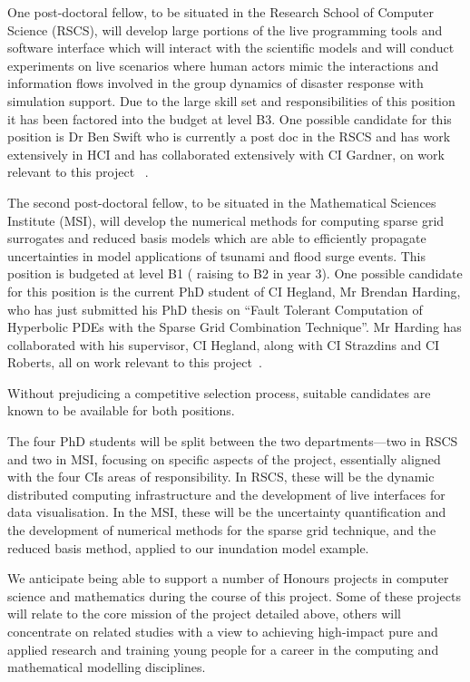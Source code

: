 One post-doctoral fellow, to be situated in the
Research School of Computer Science (RSCS), will develop large
portions of the live programming tools and software interface which
will interact with the scientific models and will conduct experiments
on live scenarios where human actors mimic the interactions and
information flows involved in the group dynamics of disaster response
with simulation support. Due to the large skill set and responsibilities of 
this position it has been factored into the budget at level B3.
One possible candidate for this position is 
Dr Ben Swift who is currently a post doc in the RSCS and has work 
extensively in HCI and has collaborated extensively with CI Gardner, on work 
relevant to this project ~\parencite{martin2016intelligent,martin2015tracking,swift2014coding,swift2013visual,swift_live_2016}.


The second post-doctoral fellow, to be
situated in the Mathematical Sciences Institute (MSI), will develop
the numerical methods for computing sparse grid surrogates and reduced
basis models which are able to efficiently propagate uncertainties in
model applications of tsunami and flood surge events. This 
position is budgeted at level B1 ( raising to B2 in year 3).
One possible candidate for this position is the current PhD 
student of CI Hegland, Mr Brendan Harding,  who has just 
submitted his PhD thesis on ``Fault Tolerant Computation of
Hyperbolic PDEs with the Sparse Grid Combination Technique''.
Mr Harding has collaborated with his supervisor, 
CI Hegland, along with CI Strazdins and CI Roberts, all
on work relevant to this project~\parencite{deBaarHarding2015,
AliEtal2015,StrazdinsEtal2015,HardingHLS2015,Ali11022016}.


Without prejudicing a competitive selection process, suitable candidates 
are known to be available for both positions.

The four PhD students will be split between the two departments---two
in RSCS and two in MSI, focusing on specific aspects of the project,
essentially aligned with the four CIs areas of responsibility.  In
RSCS, these will be the dynamic distributed computing infrastructure
and the development of live interfaces for data visualisation. In the
MSI, these will be the uncertainty quantification and the development
of numerical methods for the sparse grid technique, and the reduced
basis method, applied to our inundation model example.

We anticipate being able to support a number of Honours projects in
computer science and mathematics during the course of this
project. Some of these projects will relate to the core mission of the
project detailed above, others will concentrate on related studies
with a view to achieving high-impact pure and applied research and
training young people for a career in the computing and mathematical
modelling disciplines.

